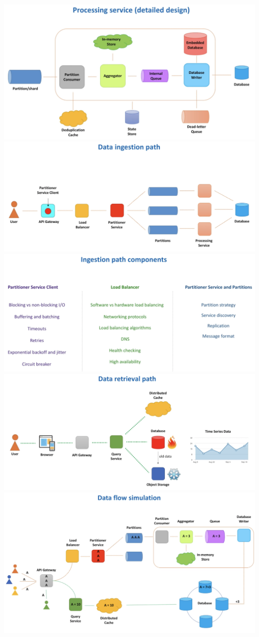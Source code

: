 \documentclass[12pt, titlepage]{article}
\begin{document}
\includegraphics[scale=0.35, angle=90]{processing-service}
\newpage
\includegraphics[scale=0.35, angle=90]{data-ingestion}
\newpage
\includegraphics[scale=0.35, angle=90]{data-ingestion-details}
\newpage
\includegraphics[scale=0.35, angle=90]{data-retrieval}
\newpage
\includegraphics[scale=0.35, angle=90]{data-flow}
\end{document}
